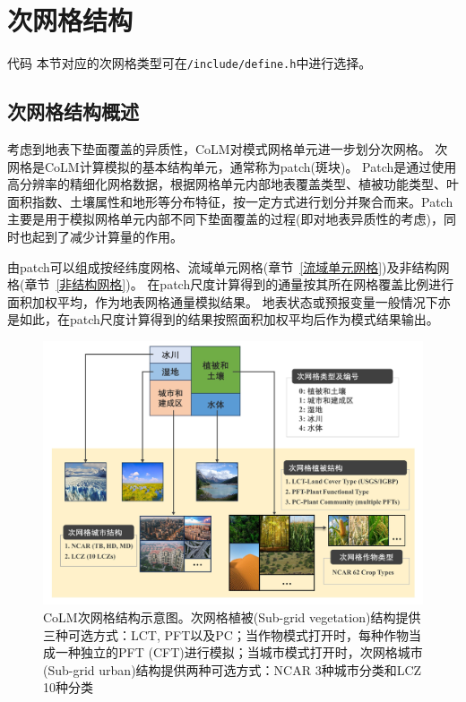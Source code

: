 \section{次网格结构}\label{次网格}
\begin{mymdframed}{代码}
  本节对应的次网格类型可在\texttt{/include/define.h}中进行选择。
\end{mymdframed}
\subsection{次网格结构概述}
考虑到地表下垫面覆盖的异质性，CoLM对模式网格单元进一步划分次网格。
次网格是CoLM计算模拟的基本结构单元，通常称为patch(斑块)。
Patch是通过使用高分辨率的精细化网格数据，根据网格单元内部地表覆盖类型、植被功能类型、叶面积指数、土壤属性和地形等分布特征，按一定方式进行划分并聚合而来。Patch主要是用于模拟网格单元内部不同下垫面覆盖的过程(即对地表异质性的考虑)，同时也起到了减少计算量的作用。


由patch可以组成按经纬度网格、流域单元网格(章节~\ref{流域单元网格})及非结构网格(章节~\ref{非结构网格})。
在patch尺度计算得到的通量按其所在网格覆盖比例进行面积加权平均，作为地表网格通量模拟结果。
地表状态或预报变量一般情况下亦是如此，在patch尺度计算得到的结果按照面积加权平均后作为模式结果输出。

{
  \begin{figure}[htbp]
    \centering
    \includegraphics[width=\textwidth]{Figures/模式构架/CoLM次网格结构示意图_v5.jpg}
    \caption[CoLM次网格结构示意图]{CoLM次网格结构示意图。次网格植被(Sub-grid vegetation)结构提供三种可选方式：LCT, PFT以及PC；当作物模式打开时，每种作物当成一种独立的PFT (CFT)进行模拟；当城市模式打开时，次网格城市(Sub-grid urban)结构提供两种可选方式：NCAR 3种城市分类和LCZ 10种分类}
    \label{fig:次网格结构示意图}
  \end{figure}
}


